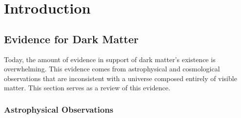 \graphicspath{{img/chapter_1/}}


\chapter{Introduction}
\label{chapter:introduction}



\section{Evidence for Dark Matter}

Today, the amount of evidence in support of dark matter's existence is overwhelming. This evidence comes from astrophysical and cosmological observations that are inconsistent with a universe composed entirely of visible matter. This section serves as a review of this evidence. 

\subsection{Astrophysical Observations}

